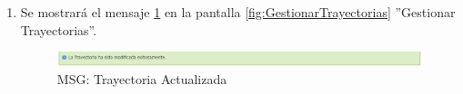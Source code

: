 \begin{enumerate}
			\item Se mostrará el mensaje \ref{fig:TrayModificada} en la pantalla \ref{fig:GestionarTrayectorias} ''Gestionar Trayectorias''.
			
			\begin{figure}[htbp!]
				\begin{center}
					\includegraphics[scale=0.6]{roles/lider/casosUso/trayectorias/pantallas/IU6-1-1-2MSG1}
					\caption{MSG: Trayectoria Actualizada}
					\label{fig:TrayModificada}
				\end{center}
			\end{figure}
			\end{enumerate}